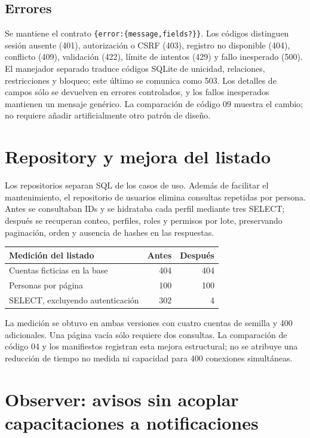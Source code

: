 \subsection{Errores}
Se mantiene el contrato \texttt{\{error:\{message,fields?\}\}}. Los códigos distinguen
sesión ausente (401), autorización o CSRF (403), registro no disponible (404),
conflicto (409), validación (422), límite de intentos (429) y fallo inesperado (500).
El manejador separado traduce códigos SQLite de unicidad, relaciones, restricciones
y bloqueo; este último se comunica como 503. Los detalles de campos sólo se
devuelven en errores controlados, y los fallos inesperados mantienen un mensaje
genérico. La comparación de código 09 muestra el cambio; no requiere añadir
artificialmente otro patrón de diseño.

\section{Repository y mejora del listado}
Los repositorios separan SQL de los casos de uso. Además de facilitar el
mantenimiento, el repositorio de usuarios elimina consultas repetidas por persona.
Antes se consultaban IDs y se hidrataba cada perfil mediante tres SELECT; después
se recuperan conteo, perfiles, roles y permisos por lote, preservando paginación,
orden y ausencia de hashes en las respuestas.

\begin{center}\begin{tabular}{lrr}
\toprule Medición del listado & Antes & Después \\ \midrule
Cuentas ficticias en la base & 404 & 404 \\
Personas por página & 100 & 100 \\
SELECT, excluyendo autenticación & 302 & 4 \\
\bottomrule
\end{tabular}\end{center}

La medición se obtuvo en ambas versiones con cuatro cuentas de semilla y 400
adicionales. Una página vacía sólo requiere dos consultas. La comparación de
código 04 y los manifiestos registran esta mejora estructural; no se atribuye
una reducción de tiempo no medida ni capacidad para 400 conexiones simultáneas.

\section{Observer: avisos sin acoplar capacitaciones a notificaciones}
